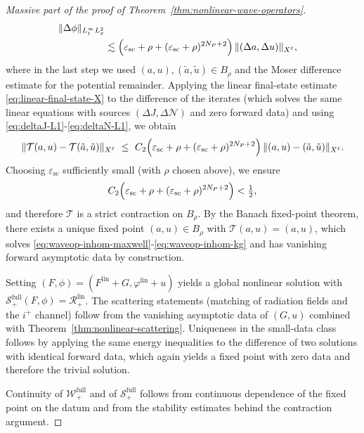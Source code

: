 \documentclass[11pt]{article}
\numberwithin{equation}{section}
\theoremstyle{plain}
\theoremstyle{definition}
\theoremstyle{remark}
\begin{document}
\begin{proof}[Massive part of the proof of Theorem~\ref{thm:nonlinear-wave-operators}]
\begin{eqnarray}
\|\Delta\phi\|_{L^{\infty}_{t}L^{2}_{x}}
\nonumber\\
&\lesssim
\Bigl(\varepsilon_{\mathrm{sc}}+\rho+(\varepsilon_{\mathrm{sc}}+\rho)^{2N_P+2}\Bigr)\,\|(\Delta a,\Delta u)\|_{X^{\ell}},
\end{eqnarray}
where in the last step we used $(a,u),(\tilde a,\tilde u)\in B_\rho$ and the Moser difference estimate for the potential remainder.
Applying the linear final-state estimate \eqref{eq:linear-final-state-X} to the difference of the iterates (which solves the same linear equations with sources $(\Delta J,\Delta\mathcal N)$ and zero forward data) and using \eqref{eq:deltaJ-L1}-\eqref{eq:deltaN-L1}, we obtain
\begin{equation}\label{eq:contraction}
\|\mathcal T(a,u)-\mathcal T(\tilde a,\tilde u)\|_{X^{\ell}}
\ \le\ C_{2}\Bigl(\varepsilon_{\mathrm{sc}}+\rho+(\varepsilon_{\mathrm{sc}}+\rho)^{2N_P+2}\Bigr)\,\|(a,u)-(\tilde a,\tilde u)\|_{X^{\ell}}.
\end{equation}
Choosing $\varepsilon_{\mathrm{sc}}$ sufficiently small (with $\rho$ chosen above), we ensure
\begin{equation}
 C_{2}\Bigl(\varepsilon_{\mathrm{sc}}+\rho+(\varepsilon_{\mathrm{sc}}+\rho)^{2N_P+2}\Bigr)<\tfrac12,
\end{equation}
and therefore $\mathcal T$ is a strict contraction on $B_\rho$.
By the Banach fixed-point theorem, there exists a unique fixed point $(a,u)\in B_\rho$ with $\mathcal T(a,u)=(a,u)$, which solves \eqref{eq:waveop-inhom-maxwell}-\eqref{eq:waveop-inhom-kg} and has vanishing forward asymptotic data by construction.


Setting $(F,\phi)=(F^{\mathrm{lin}}+G,\varphi^{\mathrm{lin}}+u)$ yields a global nonlinear solution with $\mathscr S_{+}^{\mathrm{full}}(F,\phi)=\mathcal R_{+}^{\mathrm{lin}}$.
The scattering statements (matching of radiation fields and the $i^{+}$ channel) follow from the vanishing asymptotic data of $(G,u)$ combined with Theorem~\ref{thm:nonlinear-scattering}.
Uniqueness in the small-data class follows by applying the same energy inequalities to the difference of two solutions with identical forward data, which again yields a fixed point with zero data and therefore the trivial solution.

Continuity of $\mathscr W_{+}^{\mathrm{full}}$ and of $\mathscr S_{+}^{\mathrm{full}}$ follows from continuous dependence of the fixed point on the datum and from the stability estimates behind the contraction argument.
\end{proof}
\end{document}
